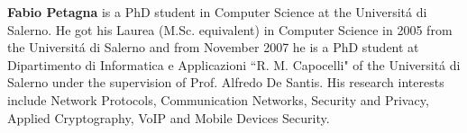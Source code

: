 \documentclass[authoryear]{elsarticle}
\begin{document}
\medskip

\textbf{Fabio Petagna} is a PhD student in Computer Science at the Universit\'{a} di Salerno. He got his Laurea
(M.Sc. equivalent) in Computer Science in 2005 from the Universit\'{a} di Salerno and from November 2007 he is a PhD student at Dipartimento di Informatica e Applicazioni ``R. M. Capocelli" of the Universit\'{a} di Salerno under the supervision of Prof. Alfredo De Santis. His research interests include Network Protocols, Communication Networks, Security and Privacy, Applied Cryptography, VoIP and Mobile Devices Security.
\end{document}
